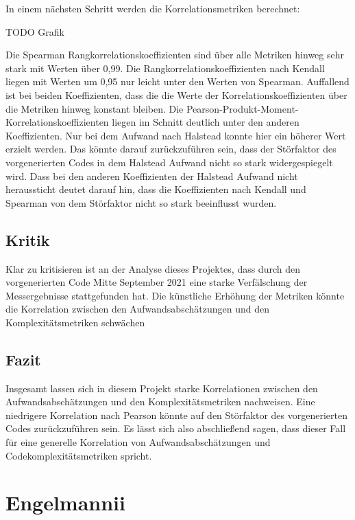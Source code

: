 In einem nächsten Schritt werden die Korrelationsmetriken berechnet:

TODO Grafik

Die Spearman Rangkorrelationskoeffizienten sind über alle Metriken
hinweg sehr stark mit Werten über 0,99. Die
Rangkorrelationskoeffizienten nach Kendall liegen mit Werten um 0,95 nur
leicht unter den Werten von Spearman. Auffallend ist bei beiden
Koeffizienten, dass die die Werte der Korrelationskoeffizienten über die
Metriken hinweg konstant bleiben. Die
Pearson-Produkt-Moment-Korrelationskoeffizienten liegen im Schnitt
deutlich unter den anderen Koeffizienten. Nur bei dem Aufwand nach
Halstead konnte hier ein höherer Wert erzielt werden. Das könnte darauf
zurückzuführen sein, dass der Störfaktor des vorgenerierten Codes in dem
Halstead Aufwand nicht so stark widergespiegelt wird. Dass bei den
anderen Koeffizienten der Halstead Aufwand nicht heraussticht deutet
darauf hin, dass die Koeffizienten nach Kendall und Spearman von dem
Störfaktor nicht so stark beeinflusst wurden.

\subsection{Kritik}\label{lm-kritik}

Klar zu kritisieren ist an der Analyse dieses Projektes, dass durch den
vorgenerierten Code Mitte September 2021 eine starke Verfälschung der
Messergebnisse stattgefunden hat. Die künstliche Erhöhung der Metriken
könnte die Korrelation zwischen den Aufwandsabschätzungen und den
Komplexitätsmetriken schwächen

\subsection{Fazit}\label{lm-fazit}

Insgesamt lassen sich in diesem Projekt starke Korrelationen zwischen
den Aufwandsabschätzungen und den Komplexitätsmetriken nachweisen. Eine
niedrigere Korrelation nach Pearson könnte auf den Störfaktor des
vorgenerierten Codes zurückzuführen sein. Es lässt sich also
abschließend sagen, dass dieser Fall für eine generelle Korrelation von
Aufwandsabschätzungen und Codekomplexitätsmetriken spricht.

\section{Engelmannii}\label{engelmannii}

